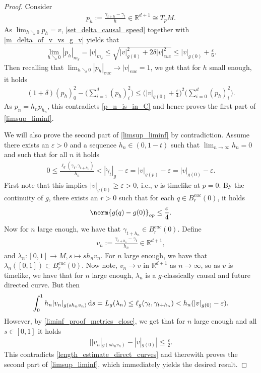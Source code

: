 \documentclass[a4paper,10pt]{article}
\numberwithin{equation}{section}
\newcommand{\R}{\mathbb{R}}
\newcommand{\e}{\varepsilon}
\newcommand{\di}{{\rm d}}
\begin{document}
\begin{proof}
Consider
\begin{align*}
    p_h := \frac{\gamma_{t+h}-\gamma_t}{h} \in \R^{d+1} \cong T_pM.
\end{align*}
As $\lim_{h \searrow 0} p_h = v$, \eqref{set_delta_causal_speed} together with \eqref{m_delta_of_v_vs_g_v} yields that 
\begin{align*}
    \lim_{h \searrow 0} |p_h|_{m_\delta} = |v|_{m_\delta} \leq \sqrt{ |v|_{g(0)}^2 + 2\delta|v|^2_{euc}} \leq |v|_{g(0)} + \frac{\e}{6}. 
\end{align*}
Then recalling that $\lim_{h \searrow 0}|p_h|_{euc} \to |v|_{euc} =  1$, we get that for $h$ small enough, it holds
\begin{align*}
     (1+\delta)(p_h)_0^2 -\Big(\sum_{i=1}^d (p_h)_i^2\Big) \leq \Big(|v|_{g(0)} + \frac{\e}{4}\Big)^2\Big(\sum_{i=0}^d (p_h)_i^2\Big).
\end{align*}
As $p_n = h_np_{h_n}$, this contradicts \eqref{p_n_is_in_C} and hence proves the first part of \eqref{limsup_liminf}. 

We will also prove the second part of \eqref{limsup_liminf} by contradiction. Assume there exists an $\e > 0$ and a sequence $h_n \in (0, 1-t)$ such that $\lim_{n \to \infty} h_n = 0$ and such that for all $n$ it holds
\begin{align*}
        0 \leq \frac{\ell_g(\gamma_t, \gamma_{t+h_n})}{h_n} < |\dot{\gamma}_t|_g - \e = |v|_{g(p)}-\e = |v|_{g(0)}-\e.
\end{align*}
First note that this implies $|v|_{g(0)} \geq \e >0$, i.e., $v$ is timelike at $p=0$. 
By the continuity of $g$, there exists an $r > 0$ such that for each $q \in B^{euc}_r(0)$, it holds
\begin{align}\label{liminf_proof_metrics_close}
    \norm{g(q)-g(0)}_{op} \leq \frac{\e}{4}.
\end{align}
Now for $n$ large enough, we have that $\gamma_{t+h_n} \in B^{euc}_r(0)$. 
Define 
\begin{align*}
    v_n:= \frac{\gamma_{t+h_n}-\gamma_{t}}{h_n} \in \R^{d+1},
\end{align*}
and $\lambda_n\colon [0, 1] \to M, s \mapsto sh_nv_n$. 
For $n$ large enough, we have that $\lambda_n([0,1]) \subset B^{euc}_r(0)$. Now note, $v_n \to v$ in $\R^{d+1}$ as $n \to \infty$, so as $v$ is timelike, we have that for $n$ large enough, $\lambda_n$ is a $g$-classically causal and future directed curve. 
But then 
\begin{align}\label{length_estimate_direct_curves}
    \int_0^1 h_n|v_n|_{g(sh_nv_n)}\, \di s = L_g(\lambda_n) \leq \ell_g(\gamma_t, \gamma_{t+h_n}) < h_n(|v|_{g(0)}-\e).
\end{align}
However, by \eqref{liminf_proof_metrics_close}, we get that for $n$ large enough and all $s \in [0,1]$ it holds
\begin{align*}
    ||v_n|_{g(sh_nv_n)}-|v|_{g(0)}|\leq \frac{\e}{2}.
\end{align*}
This contradicts \eqref{length_estimate_direct_curves} and therewith proves the second part of \eqref{limsup_liminf}, which immediately yields the desired result.
\end{proof}
\end{document}
